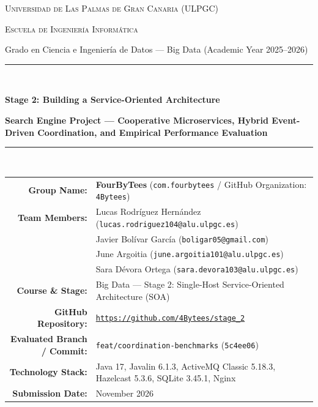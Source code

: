 \documentclass[10pt,a4paper]{article}
\begin{document}
\begin{titlepage}
    \centering
    \vspace*{0.3cm}
    {\Large\textsc{Universidad de Las Palmas de Gran Canaria (ULPGC)}\par}
    \vspace{0.15cm}
    {\large\textsc{Escuela de Ingenier\'ia Inform\'atica}\par}
    \vspace{0.15cm}
    {\large Grado en Ciencia e Ingenier\'ia de Datos --- Big Data (Academic Year 2025--2026)\par}
    \vspace{0.7cm}
    \rule{\linewidth}{0.6mm}\\[0.35cm]
    {\Huge\bfseries\color{ulpgcblue} Stage 2: Building a Service-Oriented Architecture\par}
    \vspace{0.25cm}
    {\Large\bfseries Search Engine Project --- Cooperative Microservices, Hybrid Event-Driven Coordination, and Empirical Performance Evaluation\par}
    \rule{\linewidth}{0.6mm}\\[0.7cm]

    \begin{minipage}{0.96\textwidth}
        \centering
        \small
        \renewcommand{\arraystretch}{1.28}
        \begin{tabularx}{\textwidth}{r Y}
            \textbf{Group Name:} & \textbf{FourByTees} (\texttt{com.fourbytees} / GitHub Organization: \texttt{4Bytees}) \\
            \textbf{Team Members:} & Lucas Rodr\'iguez Hern\'andez (\texttt{lucas.rodriguez104@alu.ulpgc.es}) \\
                                   & Javier Bol\'ivar Garc\'ia (\texttt{boligar05@gmail.com}) \\
                                   & June Argoitia (\texttt{june.argoitia101@alu.ulpgc.es}) \\
                                   & Sara D\'evora Ortega (\texttt{sara.devora103@alu.ulpgc.es}) \\
            \textbf{Course \& Stage:} & Big Data --- Stage 2: Single-Host Service-Oriented Architecture (SOA) \\
            \textbf{GitHub Repository:} & \href{https://github.com/4Bytees/stage_2}{\texttt{https://github.com/4Bytees/stage\_2}} \\
            \textbf{Evaluated Branch / Commit:} & \texttt{feat/coordination-benchmarks} (\texttt{5c4ee06}) \\
            \textbf{Technology Stack:} & Java 17, Javalin 6.1.3, ActiveMQ Classic 5.18.3, Hazelcast 5.3.6, SQLite 3.45.1, Nginx \\
            \textbf{Submission Date:} & November 2026
        \end{tabularx}
    \end{minipage}


\end{titlepage}
\end{document}
